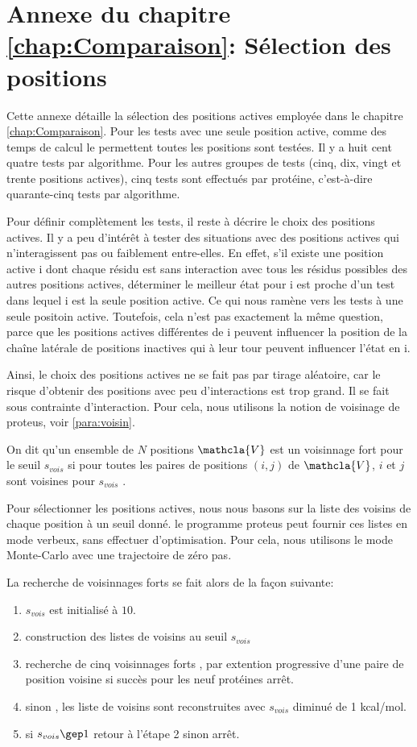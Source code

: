 \chapter*{Annexe du chapitre \ref{chap:Comparaison}: Sélection des positions }
\label{chap:annexeposi}
Cette annexe détaille la sélection des positions actives employée dans le chapitre \ref{chap:Comparaison}.
Pour les tests avec une seule position active, comme des temps de calcul le permettent toutes les positions sont testées. Il y a huit cent quatre tests par algorithme.
Pour les autres groupes de tests (cinq, dix, vingt et trente positions actives), cinq tests sont effectués par protéine, c'est-à-dire quarante-cinq tests par algorithme.

Pour définir complètement les tests, il reste à décrire le choix des positions actives.
Il y a peu d'intérêt à tester des situations avec des positions actives qui n'interagissent pas ou faiblement entre-elles.
En effet, s'il existe une position active i dont chaque résidu est sans interaction avec tous les résidus possibles des autres positions actives, déterminer le meilleur état pour i est proche d'un test dans lequel i est la seule position active. Ce qui nous ramène vers les tests à une seule positoin active. Toutefois, cela n'est pas exactement la même question, parce que les positions actives différentes de i peuvent influencer la position de la chaîne latérale de positions inactives qui à leur tour peuvent influencer l'état en i.

Ainsi, le choix des positions actives ne se fait pas par tirage aléatoire, car le risque d'obtenir des positions avec peu d'interactions est trop grand. Il se fait sous contrainte d'interaction. Pour cela, nous utilisons la notion de voisinage de proteus, voir \ref{para:voisin}.

On dit qu'un ensemble de $N$ positions $\mathcla{V}$ est un \og voisinnage fort \fg  pour le seuil $s_{vois}$ si pour toutes les paires de positions $(i,j)$ de $\mathcla{V}$, $i$ et $j$ sont voisines pour $s_{vois}$ .

Pour sélectionner les positions actives, nous nous basons sur la liste des voisins de chaque position à un seuil donné. le programme proteus peut fournir ces listes en mode verbeux, sans effectuer d'optimisation. Pour cela, nous utilisons le mode Monte-Carlo avec une trajectoire de zéro pas. 

La recherche de voisinnages forts se fait alors de la façon suivante:

\begin{enumerate}
\item $s_{vois}$ est initialisé à $10$.
\item construction des listes de voisins au seuil $s_{vois}$  
\item recherche de cinq voisinnages forts , par extention progressive d'une paire de position voisine si succès pour les neuf protéines arrêt.
\item sinon , les liste de voisins sont reconstruites avec $s_{vois}$  diminué de 1 kcal/mol. 
\item si $ s_{vois} \gep 1 $ retour à l'étape 2 sinon arrêt.  
\end{enumerate}


